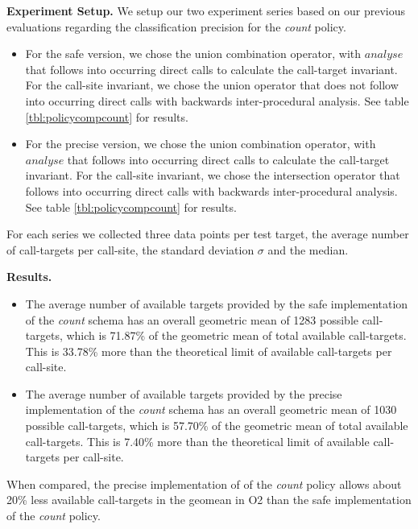 \textbf{Experiment Setup.} We setup our two experiment series based on our previous evaluations regarding the classification precision for the \textit{count} policy.
\begin{itemize}
\item For the safe version, we chose the union combination operator, with $analyse$ that follows into occurring direct calls to 
calculate the call-target invariant. For the call-site invariant, we chose the union operator that does not follow into occurring direct calls with backwards inter-procedural analysis.  See table \ref{tbl:policycompcount} for results. 
\item For the precise version, we chose the union combination operator, with $analyse$ that follows into occurring direct calls to calculate the call-target invariant. For the 
call-site invariant, we chose the intersection operator that follows into occurring direct calls with backwards inter-procedural analysis. See table \ref{tbl:policycompcount} 
for results. 
\end{itemize}
For each series we collected three data points per test target, the average number of call-targets per call-site, the standard deviation $\sigma$ and the median.

\textbf{Results.}
\begin{itemize}
\item The average number of available targets provided by the safe implementation of the \textit{count} schema has an overall geometric mean of  1283 possible call-targets, 
which is 71.87\% of the geometric mean of total available call-targets. This is 33.78\% more than the theoretical limit of available call-targets per call-site.
\item The average number of available targets provided by the precise implementation of the \textit{count} schema has an overall geometric mean of  1030 possible call-targets, 
which is 57.70\% of the geometric mean of total available call-targets. This is 7.40\% more than the theoretical limit of available call-targets per call-site.
\end{itemize}

When compared, the precise implementation of of the \textit{count} policy allows about 20\% less available call-targets in the geomean in O2 than the safe implementation of 
the \textit{count} policy.


